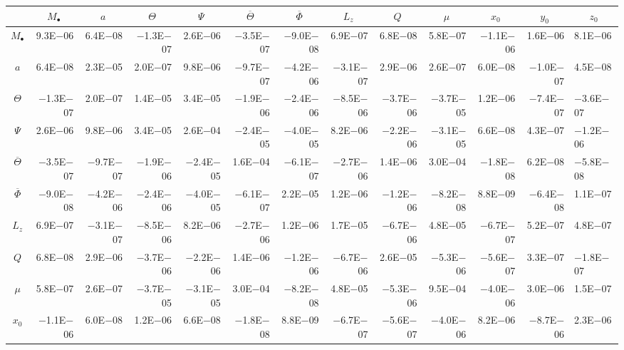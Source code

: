 \begin{sidewaystable}[htbp]\squeezetable
\centering
\begin{tabular}{crrrrrrrrrrr}
\toprule
 &  &  &  &  &  &  &  &  &  &  &  &  \\ \midrule 
$M_\bullet$ & 9.3E$-$06 & 6.4E$-$08 & $-$1.3E$-$07 & 2.6E$-$06 & $-$3.5E$-$07 & $-$9.0E$-$08 & 6.9E$-$07 & 6.8E$-$08 & 5.8E$-$07 & $-$1.1E$-$06 & 1.6E$-$06 & 8.1E$-$06 \\
$a$ & 6.4E$-$08 & 2.3E$-$05 & 2.0E$-$07 & 9.8E$-$06 & $-$9.7E$-$07 & $-$4.2E$-$06 & $-$3.1E$-$07 & 2.9E$-$06 & 2.6E$-$07 & 6.0E$-$08 & $-$1.0E$-$07 & 4.5E$-$08 \\
$\Theta$ & $-$1.3E$-$07 & 2.0E$-$07 & 1.4E$-$05 & 3.4E$-$05 & $-$1.9E$-$06 & $-$2.4E$-$06 & $-$8.5E$-$06 & $-$3.7E$-$06 & $-$3.7E$-$05 & 1.2E$-$06 & $-$7.4E$-$07 & $-$3.6E$-$07 \\
$\Psi$ & 2.6E$-$06 & 9.8E$-$06 & 3.4E$-$05 & 2.6E$-$04 & $-$2.4E$-$05 & $-$4.0E$-$05 & 8.2E$-$06 & $-$2.2E$-$06 & $-$3.1E$-$05 & 6.6E$-$08 & 4.3E$-$07 & $-$1.2E$-$06 \\
$\overline{\Theta}$ & $-$3.5E$-$07 & $-$9.7E$-$07 & $-$1.9E$-$06 & $-$2.4E$-$05 & 1.6E$-$04 & $-$6.1E$-$07 & $-$2.7E$-$06 & 1.4E$-$06 & 3.0E$-$04 & $-$1.8E$-$08 & 6.2E$-$08 & $-$5.8E$-$08 \\
$\overline{\Phi}$ & $-$9.0E$-$08 & $-$4.2E$-$06 & $-$2.4E$-$06 & $-$4.0E$-$05 & $-$6.1E$-$07 & 2.2E$-$05 & 1.2E$-$06 & $-$1.2E$-$06 & $-$8.2E$-$08 & 8.8E$-$09 & $-$6.4E$-$08 & 1.1E$-$07 \\
$L_z$ & 6.9E$-$07 & $-$3.1E$-$07 & $-$8.5E$-$06 & 8.2E$-$06 & $-$2.7E$-$06 & 1.2E$-$06 & 1.7E$-$05 & $-$6.7E$-$06 & 4.8E$-$05 & $-$6.7E$-$07 & 5.2E$-$07 & 4.8E$-$07 \\
$Q$ & 6.8E$-$08 & 2.9E$-$06 & $-$3.7E$-$06 & $-$2.2E$-$06 & 1.4E$-$06 & $-$1.2E$-$06 & $-$6.7E$-$06 & 2.6E$-$05 & $-$5.3E$-$06 & $-$5.6E$-$07 & 3.3E$-$07 & $-$1.8E$-$07 \\
$\mu$ & 5.8E$-$07 & 2.6E$-$07 & $-$3.7E$-$05 & $-$3.1E$-$05 & 3.0E$-$04 & $-$8.2E$-$08 & 4.8E$-$05 & $-$5.3E$-$06 & 9.5E$-$04 & $-$4.0E$-$06 & 3.0E$-$06 & 1.5E$-$07 \\
$x_0$ & $-$1.1E$-$06 & 6.0E$-$08 & 1.2E$-$06 & 6.6E$-$08 & $-$1.8E$-$08 & 8.8E$-$09 & $-$6.7E$-$07 & $-$5.6E$-$07 & $-$4.0E$-$06 & 8.2E$-$06 & $-$8.7E$-$06 & 2.3E$-$06 \\

\end{tabular}
\end{sidewaystable}
